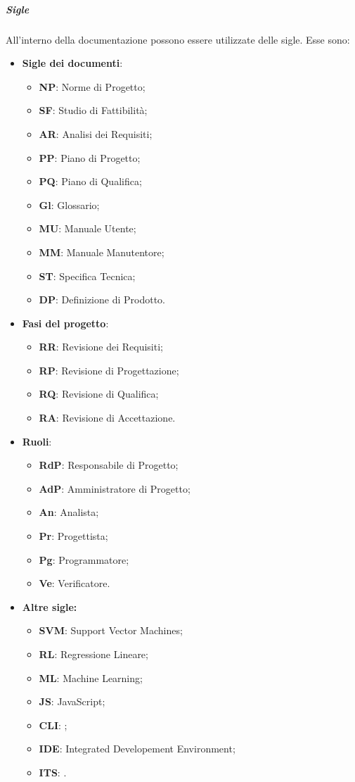 \documentclass[../norme-di-progetto.tex]{subfiles}
\begin{document}
\subparagraph{Sigle}
All'interno della documentazione possono essere utilizzate delle sigle. Esse sono:
\begin{itemize}
  \item \textbf{Sigle dei documenti}:
  \begin{itemize}
    \item \textbf{NP}: Norme di Progetto;
    \item \textbf{SF}: Studio di Fattibilità;
    \item \textbf{AR}: Analisi dei Requisiti;
    \item \textbf{PP}: Piano di Progetto;
    \item \textbf{PQ}: Piano di Qualifica;
    \item \textbf{Gl}: Glossario;
    \item \textbf{MU}: Manuale Utente;
    \item \textbf{MM}: Manuale Manutentore;
    \item \textbf{ST}: Specifica Tecnica;
    \item \textbf{DP}: Definizione di Prodotto.
  \end{itemize}

  \item \textbf{Fasi del progetto}:
  \begin{itemize}
  \item \textbf{RR}: Revisione dei Requisiti;
  \item \textbf{RP}: Revisione di Progettazione;
  \item \textbf{RQ}: Revisione di Qualifica;
  \item \textbf{RA}: Revisione di Accettazione.
  \end{itemize}
  \item \textbf{Ruoli}:
  \begin{itemize}
  \item \textbf{RdP}: Responsabile di Progetto;
  \item \textbf{AdP}: Amministratore di Progetto;
  \item \textbf{An}: Analista;
  \item \textbf{Pr}: Progettista;
  \item \textbf{Pg}: Programmatore;
  \item \textbf{Ve}: Verificatore.
  \end{itemize}
  \item \textbf{Altre sigle:}
  \begin{itemize}
    \item \textbf{SVM}: Support Vector Machines;
    \item \textbf{RL}: Regressione Lineare;
    \item \textbf{ML}: Machine Learning;
    \item \textbf{JS}: JavaScript;
    \item \textbf{CLI}: ;
    \item \textbf{IDE}: Integrated Developement Environment;
    \item \textbf{ITS}: .
  \end{itemize}
\end{itemize}
\end{document}
